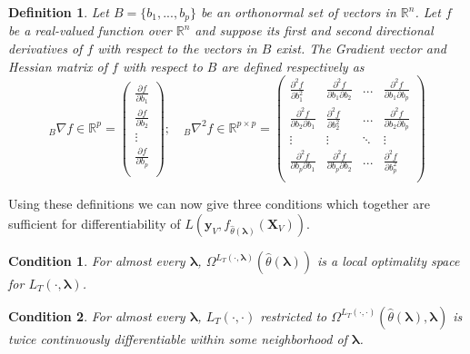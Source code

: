 \documentclass[10pt,letterpaper]{article}
\newtheorem{definition}{Definition}
\newtheorem{condition}{Condition}
\begin{document}
\begin{definition}
Let $B = \{ b_1, ..., b_p \}$ be an orthonormal set of vectors in $\mathbb{R}^n$. Let $f$ be a real-valued function over $\mathbb{R}^n$ and suppose its first and second directional derivatives of $f$ with respect to the vectors in $B$ exist. The Gradient vector and Hessian matrix of $f$ with respect to $B$ are defined respectively as
\begin{equation}\label{eq:hess}
_B\nabla f \in \mathbb{R}^{p} =
\left (
\begin{array}{c}
\frac{\partial f}{\partial b_1} \\
\frac{\partial f}{\partial b_2} \\
\vdots\\
\frac{\partial f}{\partial b_p}\\
\end{array}
\right );
\quad
_B\nabla^2 f \in \mathbb{R}^{p\times p} =
\left (
\begin{array}{cccc}
\frac{\partial^2 f}{\partial b_1^2} & \frac{\partial^2 f}{\partial b_1 \partial b_2} & ...  & \frac{\partial^2 f}{\partial b_1 \partial b_p} \\
\frac{\partial^2 f}{\partial b_2 \partial b_1} & \frac{\partial^2 f}{\partial b_2^2} & ...  & \frac{\partial^2 f}{\partial b_2 \partial b_p} \\
\vdots & \vdots &  \ddots & \vdots \\
\frac{\partial^2 f}{\partial b_p \partial b_1} & \frac{\partial^2 f}{\partial b_p \partial b_2} & ...  & \frac{\partial^2 f}{\partial b_p^2} \\
\end{array}
\right )
\end{equation}
\end{definition}

Using these definitions we can now give three conditions which together are sufficient for differentiability of $L \left( \boldsymbol{y}_V, f_{\hat{\theta}(\boldsymbol{\lambda})}(\boldsymbol{X}_V) \right )$.

\begin{condition}
For almost every $\boldsymbol{\lambda}$, $\Omega^{L_T(\cdot, \boldsymbol{\lambda})}(\hat{\theta}\left(\boldsymbol{\lambda}\right))$ is a local optimality space for $L_T\left(\cdot,\boldsymbol{\lambda}\right)$.
\end{condition}

\begin{condition}
For almost every $\boldsymbol{\lambda}$, $L_T\left(\cdot, \cdot\right)$ restricted to $\Omega^{L_T(\cdot, \cdot)}(\hat{\theta}\left(\boldsymbol{\lambda}\right), \boldsymbol{\lambda})$ is twice continuously differentiable within some neighborhood of $\boldsymbol{\lambda}$.
\end{condition}
\end{document}
